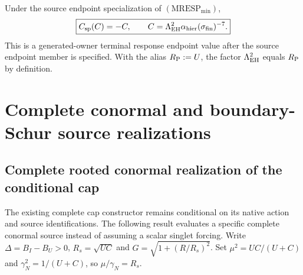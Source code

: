 \documentclass[12pt,a4paper]{article}
\begin{document}
\begin{corollary}
\label{p3:cor:frozen-constant-term-readout}
\label{p3:eq:terminal-correction-value}
Under the source endpoint specialization of
\((\mathrm{MRESP}_{\min})\),
\[
 \boxed{C_{\rm sp}(C)=-C,\qquad
        C=\Lambda_{\rm EH}^2
        \alpha_{\rm hier}(\sigma_{\rm fin})^{-7}.}
\]
This is a generated-owner terminal response endpoint value after the source
endpoint member is specified.  With the alias \(R_{\mathrm P}:=U\), the factor \(\Lambda_{\rm EH}^2\) equals
\(R_{\mathrm P}\) by definition.
\end{corollary}

\label{p3:part:scalar-threshold-handoffs}


\section{Complete conormal and boundary-Schur source realizations}
\label{paper3e:sec:v204-source-realizations}
\subsection{Complete rooted conormal realization of the conditional cap}
\label{p3e:sec:v229-conormal-cap}
The existing complete cap constructor remains conditional on its native
action and source identifications. The following result evaluates a
specific complete conormal source instead of assuming a scalar singlet
forcing. Write $\Delta=B_I-B_U>0$, $R_s=\sqrt{UC}$ and
$G=\sqrt{1+(R/R_s)^2}$. Set $\mu^2=UC/(U+C)$ and
$\gamma_N^2=1/(U+C)$, so $\mu/\gamma_N=R_s$.
\end{document}
